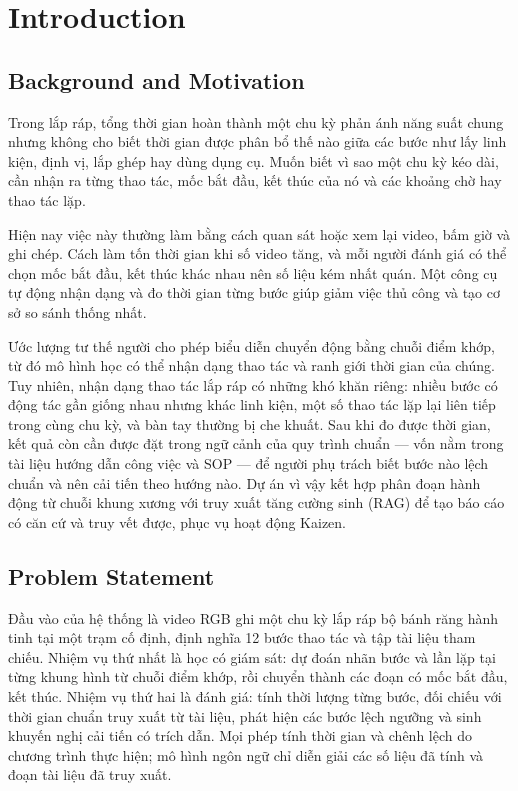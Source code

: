 \section{Introduction}

\subsection{Background and Motivation}

Trong lắp ráp, tổng thời gian hoàn thành một chu kỳ phản ánh năng suất chung nhưng không cho biết thời gian được phân bổ thế nào giữa các bước như lấy linh kiện, định vị, lắp ghép hay dùng dụng cụ. Muốn biết vì sao một chu kỳ kéo dài, cần nhận ra từng thao tác, mốc bắt đầu, kết thúc của nó và các khoảng chờ hay thao tác lặp.

Hiện nay việc này thường làm bằng cách quan sát hoặc xem lại video, bấm giờ và ghi chép. Cách làm tốn thời gian khi số video tăng, và mỗi người đánh giá có thể chọn mốc bắt đầu, kết thúc khác nhau nên số liệu kém nhất quán. Một công cụ tự động nhận dạng và đo thời gian từng bước giúp giảm việc thủ công và tạo cơ sở so sánh thống nhất.

Ước lượng tư thế người cho phép biểu diễn chuyển động bằng chuỗi điểm khớp, từ đó mô hình học có thể nhận dạng thao tác và ranh giới thời gian của chúng. Tuy nhiên, nhận dạng thao tác lắp ráp có những khó khăn riêng: nhiều bước có động tác gần giống nhau nhưng khác linh kiện, một số thao tác lặp lại liên tiếp trong cùng chu kỳ, và bàn tay thường bị che khuất. Sau khi đo được thời gian, kết quả còn cần được đặt trong ngữ cảnh của quy trình chuẩn — vốn nằm trong tài liệu hướng dẫn công việc và SOP — để người phụ trách biết bước nào lệch chuẩn và nên cải tiến theo hướng nào. Dự án vì vậy kết hợp phân đoạn hành động từ chuỗi khung xương với truy xuất tăng cường sinh (RAG) để tạo báo cáo có căn cứ và truy vết được, phục vụ hoạt động Kaizen.

\subsection{Problem Statement}

Đầu vào của hệ thống là video RGB ghi một chu kỳ lắp ráp bộ bánh răng hành tinh tại một trạm cố định, định nghĩa 12 bước thao tác và tập tài liệu tham chiếu. Nhiệm vụ thứ nhất là học có giám sát: dự đoán nhãn bước và lần lặp tại từng khung hình từ chuỗi điểm khớp, rồi chuyển thành các đoạn có mốc bắt đầu, kết thúc. Nhiệm vụ thứ hai là đánh giá: tính thời lượng từng bước, đối chiếu với thời gian chuẩn truy xuất từ tài liệu, phát hiện các bước lệch ngưỡng và sinh khuyến nghị cải tiến có trích dẫn. Mọi phép tính thời gian và chênh lệch do chương trình thực hiện; mô hình ngôn ngữ chỉ diễn giải các số liệu đã tính và đoạn tài liệu đã truy xuất.

